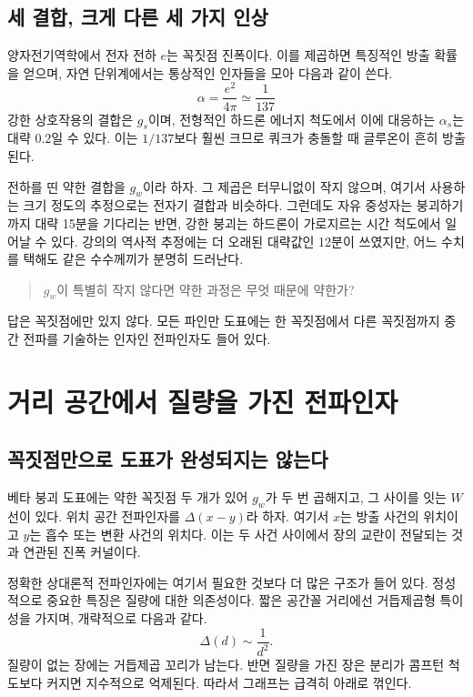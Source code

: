 \subsection{세 결합, 크게 다른 세 가지 인상}

양자전기역학에서 전자 전하 \(e\)는 꼭짓점 진폭이다. 이를 제곱하면 특징적인 방출 확률을 얻으며, 자연 단위계에서는 통상적인 인자들을 모아 다음과 같이 쓴다.
\begin{equation}
  \alpha=\frac{e^2}{4\pi}\simeq\frac1{137}
\end{equation}
강한 상호작용의 결합은 \(g_s\)이며, 전형적인 하드론 에너지 척도에서 이에 대응하는 \(\alpha_s\)는 대략 \(0.2\)일 수 있다. 이는 \(1/137\)보다 훨씬 크므로 쿼크가 충돌할 때 글루온이 흔히 방출된다.

전하를 띤 약한 결합을 \(g_w\)이라 하자. 그 제곱은 터무니없이 작지 않으며, 여기서 사용하는 크기 정도의 추정으로는 전자기 결합과 비슷하다. 그런데도 자유 중성자는 붕괴하기까지 대략 15분을 기다리는 반면, 강한 붕괴는 하드론이 가로지르는 시간 척도에서 일어날 수 있다. 강의의 역사적 추정에는 더 오래된 대략값인 12분이 쓰였지만, 어느 수치를 택해도 같은 수수께끼가 분명히 드러난다.\begin{quote}\(g_w\)이 특별히 작지 않다면 약한 과정은 무엇 때문에 약한가?
\end{quote}

답은 꼭짓점에만 있지 않다. 모든 파인만 도표에는 한 꼭짓점에서 다른 꼭짓점까지 중간 전파를 기술하는 인자인 전파인자도 들어 있다.

\section{거리 공간에서 질량을 가진 전파인자}

\subsection{꼭짓점만으로 도표가 완성되지는 않는다}

베타 붕괴 도표에는 약한 꼭짓점 두 개가 있어 \(g_w\)가 두 번 곱해지고, 그 사이를 잇는 \(W\) 선이 있다. 위치 공간 전파인자를 \(\Delta(x-y)\)라 하자. 여기서 \(x\)는 방출 사건의 위치이고 \(y\)는 흡수 또는 변환 사건의 위치다. 이는 두 사건 사이에서 장의 교란이 전달되는 것과 연관된 진폭 커널이다.

정확한 상대론적 전파인자에는 여기서 필요한 것보다 더 많은 구조가 들어 있다. 정성적으로 중요한 특징은 질량에 대한 의존성이다. 짧은 공간꼴 거리에선 거듭제곱형 특이성을 가지며, 개략적으로 다음과 같다.
\begin{equation}
  \Delta(d)\sim\frac1{d^2}.
\end{equation}
질량이 없는 장에는 거듭제곱 꼬리가 남는다. 반면 질량을 가진 장은 분리가 콤프턴 척도보다 커지면 지수적으로 억제된다. 따라서 그래프는 급격히 아래로 꺾인다.

